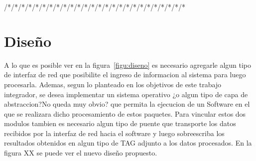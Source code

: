 /*/*/*/*/*/*/*/*/*/*/*/*/*/*/*/*/*/*/*/*/*/*/*/*/*/*
%
\section{Diseño}
A lo que es posible ver en la figura~\ref{figu:diseno} es necesario agregarle algun tipo de interfaz de red que posibilite el ingreso de informacion al sistema para luego procesarla. Ademas, segun lo planteado en los objetivos de este trabajo integrador, se desea implementar un sistema operativo ¿o algun tipo de capa de abstraccion?{No queda muy obvio?} que permita la ejecucion de un Software en el que se realizara dicho procesamiento de estos paquetes. Para vincular estos dos modulos tambien es necesario algun tipo de puente que transporte los datos recibidos por la interfaz de red hacia el software y luego sobreescriba los resultados obtenidos en algun tipo de TAG adjunto a los datos procesados. En la figura XX se puede ver el nuevo diseño propuesto.

